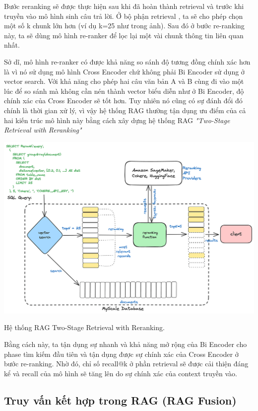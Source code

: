 \documentclass[a4paper, 12pt, openany]{book}
\begin{document}
Bước reranking sẽ được thực hiện sau khi đã hoàn thành retrieval và trước khi truyền vào mô hình sinh câu trả lời. Ở bộ phận retrieval
, ta sẽ cho phép chọn một số k chunk lớn hơn (ví dụ k=25 như trong ảnh). Sau đó ở bước re-ranking này, ta sẽ dùng mô hình re-ranker để lọc lại một vài chunk thông tin liên quan nhất.

Sở dĩ, mô hình re-ranker có được khả năng so sánh độ tương đồng chính xác hơn là vì nó sử dụng mô hình Cross Encoder chứ không phải Bi Encoder sử dụng ở vector search.
Với khả năng cho phép hai câu văn bản A và B cùng đi vào một lúc để so sánh mà không cần nén thành vector biểu diễn như ở Bi Encoder, độ chính xác của Cross Encoder sẽ tốt hơn.
Tuy nhiên nó cũng có sự đánh đổi đó chính là thời gian xử lý, vì vậy hệ thống RAG thường tận dụng ưu điểm của cả hai kiến trúc mô hình này bằng cách xây dựng hệ thống RAG \textit{"Two-Stage Retrieval with Reranking"}

\begin{minipage}{\linewidth}
    \centering
    \includegraphics[width=.9\linewidth]{./assets/images/2phaseRAG.png}
    \captionsetup{type=figure}
    \caption{Hệ thống RAG Two-Stage Retrieval with Reranking.}
\end{minipage}
\vspace{0.5cm} 

Bằng cách này, ta tận dụng sự nhanh và khả năng mở rộng của Bi Encoder cho phase tìm kiếm đầu tiên và tận dụng được sự chính xác của Cross Encoder ở bước re-ranking.
Nhờ đó, chỉ số recall@k ở phần retrieval sẽ được cải thiện đáng kể và recall của mô hình sẽ tăng lên do sự chính xác của context truyền vào.

\subsection{Truy vấn kết hợp trong RAG (RAG Fusion)}
\end{document}
